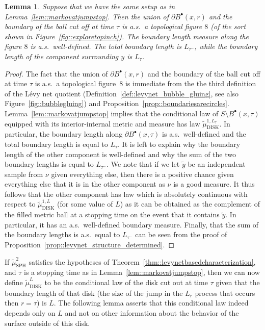 \documentclass[JEP,XML,SOM,Unicode]{cedram}
\newcommand{\sbullet}{{\scriptscriptstyle\bullet}}
\theoremstyle{plain}
\numberwithin{theorem}{section}
\newtheorem{lemma}[theorem]{Lemma}
\theoremstyle{definition}
\newcommand{\tmustwo}{\wt{\mu}_{\mathrm{SPH}}^2}
\newcommand{\tmudonel}{\wt{\mu}_{ \mathrm{DISK}}^{1, L}}
\newcommand{\tmudl}{\wt{\mu}_{\mathrm{DISK}}^L}
\def\tmudonelset#1{\wt{\mu}_{ \mathrm{DISK}}^{1, #1}}
\let\wt\widetilde
\newcommand{\fb}[2]{B^\sbullet(#1,#2)}
\begin{document}
\begin{lemma}
\label{lem::figureeightlaws}
Suppose that we have the same setup as in Lemma~\ref{lem::markovatjumpstop}. Then the union of $\partial\fb{x}{r}$ and the boundary of the ball cut off at time $\tau$ is a.s.\ a topological figure $8$ (of the sort shown in Figure~\ref{fig::exploretopinch}). The boundary length measure along the figure $8$ is a.s.\ well-defined. The total boundary length is $L_{\tau^-}$, while the boundary length of the component surrounding $y$ is $L_\tau$.
\end{lemma}
\begin{proof}
The fact that the union of $\partial\fb{x}{r}$ and the boundary of the ball cut off at time $\tau$ is a.s.\ a topological figure~$8$ is immediate from the the third definition of the Lévy net quotient (Definition~\ref{def::levynet_bubble_gluing}, see also Figure~\ref{fig::bubblegluing}) and Proposition~\ref{prop::boundariesarecircles}. Lemma~\ref{lem::markovatjumpstop} implies that the conditional law of $S \setminus \fb{x}{\tau}$ equipped with its interior-internal metric and measure has law $\tmudonelset{L_\tau}$. In particular, the boundary length along $\partial \fb{x}{\tau}$ is a.s.\ well-defined and the total boundary length is equal to $L_\tau$. It is left to explain why the boundary length of the other component is well-defined and why the sum of the two boundary lengths is equal to $L_{\tau^-}$. We note that if we let $\wt{y}$ be an independent sample from $\nu$ given everything else, then there is a positive chance given everything else that it is in the other component as $\nu$ is a good measure. It thus follows that the other component has law which is absolutely continuous with respect to $\tmudonel$ (for some value of $L$) as it can be obtained as the complement of the filled metric ball at a stopping time on the event that it contains $\wt{y}$. In particular, it has an a.s.\ well-defined boundary measure. Finally, that the sum of the boundary lengths is a.s.\ equal to $L_{\tau^-}$ can be seen from the proof of Proposition~\ref{prop::levynet_structure_determined}.
\end{proof}

If $\tmustwo$ satisfies the hypotheses of Theorem~\ref{thm::levynetbasedcharacterization}, and $\tau$ is a stopping time as in Lemma~\ref{lem::markovatjumpstop}, then we can now define $\tmudl$ to be the conditional law of the disk cut out at time $\tau$ given that the boundary length of that disk (\ie the size of the jump in the $L_r$ process that occurs then $r = \tau$) is $L$. The following lemma asserts that this conditional law indeed depends only on $L$ and not on other information about the behavior of the surface outside of this disk.
\end{document}
